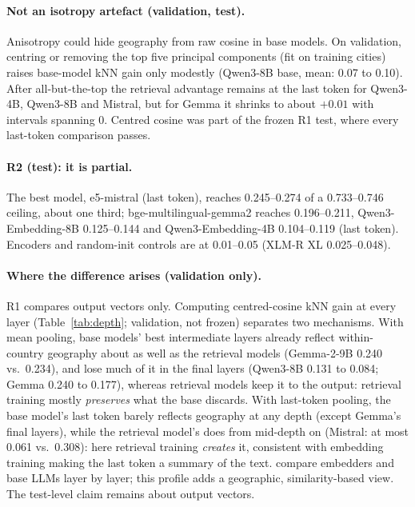 \paragraph{Not an isotropy artefact (validation, test).}
Anisotropy could hide geography from raw cosine in base models. On validation, centring or removing the top five principal components \citep{mu2018allbutthetop} (fit on training cities) raises base-model kNN gain only modestly (Qwen3-8B base, mean: 0.07 to 0.10). After all-but-the-top the retrieval advantage remains at the last token for Qwen3-4B, Qwen3-8B and Mistral, but for Gemma it shrinks to about $+0.01$ with intervals spanning 0. Centred cosine was part of the frozen R1 test, where every last-token comparison passes.

\paragraph{R2 (test): it is partial.}
The best model, e5-mistral (last token), reaches 0.245--0.274 of a 0.733--0.746 ceiling, about one third; bge-multilingual-gemma2 reaches 0.196--0.211, Qwen3-Embedding-8B 0.125--0.144 and Qwen3-Embedding-4B 0.104--0.119 (last token). Encoders and random-init controls are at 0.01--0.05 (XLM-R XL 0.025--0.048).

\paragraph{Where the difference arises (validation only).}
R1 compares output vectors only. Computing centred-cosine kNN gain at every layer (Table~\ref{tab:depth}; validation, not frozen) separates two mechanisms. With mean pooling, base models' best intermediate layers already reflect within-country geography about as well as the retrieval models (Gemma-2-9B 0.240 vs.\ 0.234), and lose much of it in the final layers (Qwen3-8B 0.131 to 0.084; Gemma 0.240 to 0.177), whereas retrieval models keep it to the output: retrieval training mostly \emph{preserves} what the base discards. With last-token pooling, the base model's last token barely reflects geography at any depth (except Gemma's final layers), while the retrieval model's does from mid-depth on (Mistral: at most 0.061 vs.\ 0.308): here retrieval training \emph{creates} it, consistent with embedding training making the last token a summary of the text. \citet{jiang2026layerwise} compare embedders and base LLMs layer by layer; this profile adds a geographic, similarity-based view. The test-level claim remains about output vectors.

